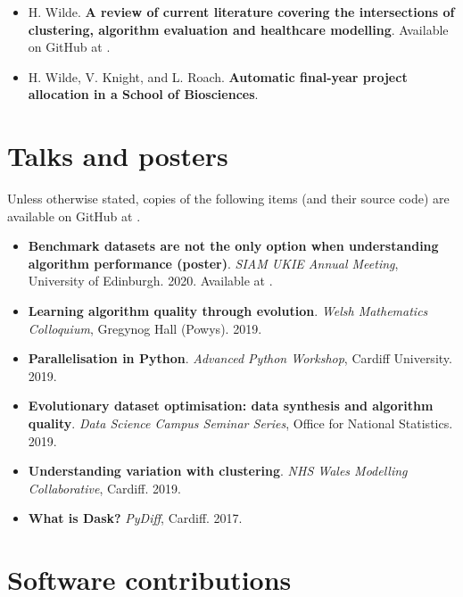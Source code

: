\begin{itemize}
    \item H. Wilde. \textbf{A review of current literature covering the
        intersections of clustering, algorithm evaluation and healthcare
        modelling}. Available on GitHub at
        .
    \item H. Wilde, V. Knight, and L. Roach. \textbf{Automatic final-year
        project allocation in a School of Biosciences}.
\end{itemize}

\section*{Talks and posters}

Unless otherwise stated, copies of the following items (and their source code)
are available on GitHub at .

\begin{itemize}
    \item \textbf{Benchmark datasets are not the only option when understanding
        algorithm performance (poster)}. \emph{SIAM UKIE Annual Meeting},
        University of Edinburgh. 2020. Available at
        . 
    \item \textbf{Learning algorithm quality through evolution}.
        \emph{Welsh Mathematics Colloquium}, Gregynog Hall (Powys). 2019.
    \item \textbf{Parallelisation in Python}. \emph{Advanced Python Workshop},
        Cardiff University. 2019.
    \item \textbf{Evolutionary dataset optimisation: data synthesis and
        algorithm quality}. \emph{Data Science Campus Seminar Series}, Office
        for National Statistics. 2019.
    \item \textbf{Understanding variation with clustering}.
        \emph{NHS Wales Modelling Collaborative}, Cardiff. 2019.
    \item \textbf{What is Dask?} \emph{PyDiff}, Cardiff. 2017.
\end{itemize}

\section*{Software contributions}

